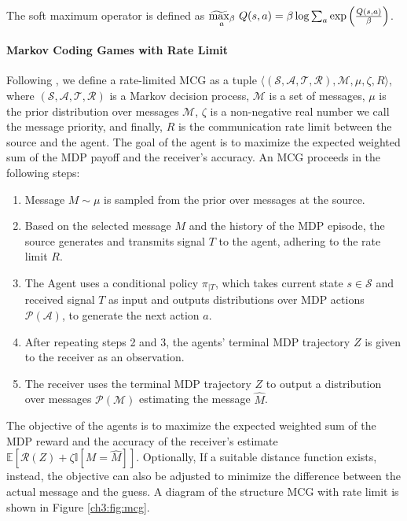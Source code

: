 The soft maximum operator is defined as $\stackMath\stackunder[0.1pt]{\widetilde{\max}_\beta}{_a} \ Q(s,a) = \beta\log\sum_a \exp \left( \frac{Q(s,a)}{\beta} \right)$.

\paragraph{Markov Coding Games with Rate Limit} 
Following \cite{sokota2022communicating}, we define a rate-limited MCG as a tuple $\langle (\mathcal{S},  \mathcal{A}, \mathcal{T}, \mathcal{R}), \mathcal{M}, \mu, \zeta, R \rangle$, where \((\mathcal{S}, \mathcal{A}, \mathcal{T}, \mathcal{R})\) is a Markov decision process, \(\mathcal{M}\) is a set of messages, \(\mu\) is the prior distribution over messages \(\mathcal{M}\), \(\zeta\) is a non-negative real number we call the message priority, and finally, $R$ is the communication rate limit between the source and the agent. The goal of the agent is to maximize the expected weighted sum of the MDP payoff and the receiver’s accuracy. An MCG proceeds in the following steps:
\begin{enumerate}
    \item  Message \(M \sim \mu\) is sampled from the prior over messages at the source.
    \item Based on the selected message $M$ and the history of the MDP episode, the source generates and transmits signal $T$ to the agent, adhering to the rate limit $R$.
    \item The Agent uses a conditional policy $\pi_{|T}$, which takes current state \(s \in \mathcal{S}\) and received signal \(T \) as input and outputs distributions over MDP actions \(\mathcal{P}(\mathcal{A})\), to generate the next action $a$. 
    \item After repeating steps 2 and 3, the agents’ terminal MDP trajectory \(Z\) is given to the receiver as an observation.
    \item The receiver uses the terminal MDP trajectory $Z$ to output a distribution over messages \(\mathcal{P}(\mathcal{M})\) estimating the message \(\hat{M}\).
\end{enumerate}

The objective of the agents is to maximize the expected weighted sum of the MDP reward and the accuracy of the receiver’s estimate \(\mathbb{E} [\mathcal{R}(Z) + \zeta\mathbb{I}[M = \hat{M}] ]\). Optionally,
If a suitable distance function exists, instead, the objective can also be adjusted to minimize the difference between the actual message and the guess. A diagram of the structure MCG with rate limit is shown in Figure \ref{ch3:fig:mcg}.

